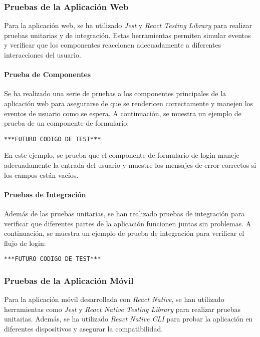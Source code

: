 \subsubsection{Pruebas de la Aplicación Web}
Para la aplicación web, se ha utilizado \textit{Jest} y \textit{React Testing Library} para realizar pruebas unitarias y de integración. Estas herramientas permiten simular eventos y verificar que los componentes reaccionen adecuadamente a diferentes interacciones del usuario.

\paragraph{Prueba de Componentes}
Se ha realizado una serie de pruebas a los componentes principales de la aplicación web para asegurarse de que se rendericen correctamente y manejen los eventos de usuario como se espera. A continuación, se muestra un ejemplo de prueba de un componente de formulario:

\begin{verbatim}
***FUTURO CODIGO DE TEST***
\end{verbatim}

En este ejemplo, se prueba que el componente de formulario de login maneje adecuadamente la entrada del usuario y muestre los mensajes de error correctos si los campos están vacíos.

\paragraph{Pruebas de Integración}
Además de las pruebas unitarias, se han realizado pruebas de integración para verificar que diferentes partes de la aplicación funcionen juntas sin problemas. A continuación, se muestra un ejemplo de prueba de integración para verificar el flujo de login:

\begin{verbatim}
***FUTURO CODIGO DE TEST***
\end{verbatim}

\subsubsection{Pruebas de la Aplicación Móvil}
Para la aplicación móvil desarrollada con \textit{React Native}, se han utilizado herramientas como \textit{Jest} y \textit{React Native Testing Library} para realizar pruebas unitarias. Además, se ha utilizado \textit{React Native CLI} para probar la aplicación en diferentes dispositivos y asegurar la compatibilidad.

